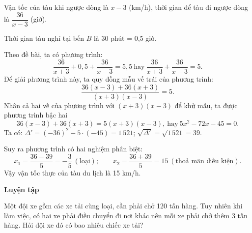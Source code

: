 \begin{lesson}
    Vận tốc của tàu khi ngược dòng là $x-3$ (km/h), thời gian để tàu đi ngược dòng là $\dfrac{36}{x-3}$ (giờ).

    Thời gian tàu nghỉ tại bến $B$ là 30 phút = 0,5 giờ.

    Theo đề bài, ta có phương trình:
    \[
        \dfrac{36}{x+3}+0{,}5+\dfrac{36}{x-3}=5{,}5
        \ \text{hay}\ 
        \dfrac{36}{x+3}+\dfrac{36}{x-3}=5.
    \]
    Để giải phương trình này, ta quy đồng mẫu vế trái của phương trình:
    \[
        \dfrac{36(x-3)+36(x+3)}{(x+3)(x-3)}=5.
    \]
    Nhân cả hai vế của phương trình với $(x+3)(x-3)$ để khử mẫu, ta được phương trình bậc hai
    \[
        36(x-3)+36(x+3)=5(x+3)(x-3),\ \text{hay}\ 5x^2-72x-45=0.
    \]
    Ta có: $\Delta'=(-36)^2-5\cdot(-45)=1\,521$; $\sqrt{\Delta'}=\sqrt{1\,521}=39$.

    Suy ra phương trình có hai nghiệm phân biệt:
    \[
        x_1=\dfrac{36-39}{5}=-\dfrac{3}{5}\ (\text{loại});\qquad
        x_2=\dfrac{36+39}{5}=15\ (\text{thoả mãn điều kiện}).
    \]
    Vậy vận tốc thực của tàu du lịch là 15 km/h.

    \textbf{Luyện tập}

    Một đội xe gồm các xe tải cùng loại, cần phải chở 120 tấn hàng. Tuy nhiên khi làm việc, có hai xe phải điều chuyển đi nơi khác nên mỗi xe phải chở thêm 3 tấn hàng. Hỏi đội xe đó có bao nhiêu chiếc xe tải?

    \answerline
    \answerline
    \answerline
\end{lesson}

